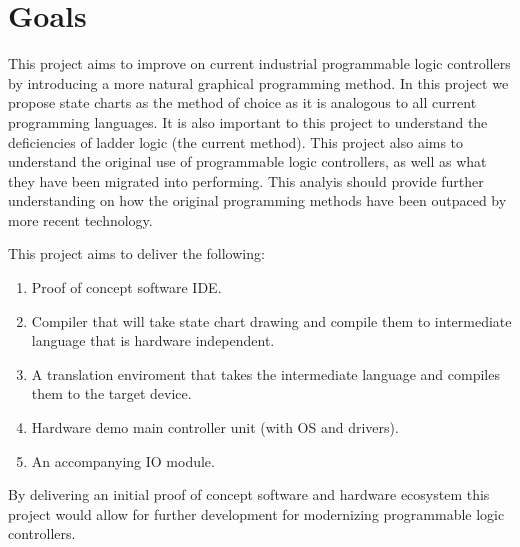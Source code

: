 \section{Goals}

This project aims to improve on current industrial programmable logic controllers by introducing a more natural graphical programming method. In this project we propose state charts as the method of choice as it is analogous to all current programming languages. It is also important to this project to understand the deficiencies of ladder logic (the current method). This project also aims to understand the original use of programmable logic controllers, as well as what they have been migrated into performing. This analyis should provide further understanding on how the original programming methods have been outpaced by more recent technology.

This project aims to deliver the following:
\begin{enumerate}
\item Proof of concept software IDE.
\item Compiler that will take state chart drawing and compile them to intermediate language that is hardware independent.
\item A translation enviroment that takes the intermediate language and compiles them to the target device. 
\item Hardware demo main controller unit (with OS and drivers).
\item An accompanying IO module. %
\end{enumerate}
By delivering an initial proof of concept software and hardware ecosystem this project would allow for further development for modernizing programmable logic controllers.